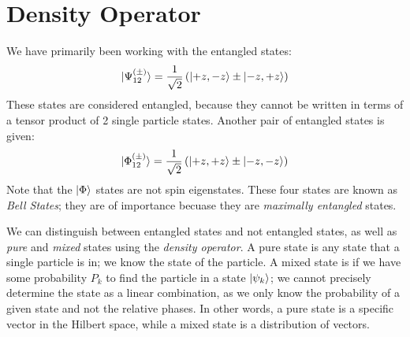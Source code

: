 \section{Density Operator}
We have primarily been working with the entangled states:
\begin{equation}
	\lvert\Psi_{12}^{(\pm)}\rangle=\frac{1}{\sqrt{2}}\left(\lvert+z,-z\rangle\pm \lvert-z,+z\rangle\right)
\end{equation}
These states are considered entangled, because they cannot be written in terms of a tensor product of 2 single particle states. Another pair of entangled states is given:
\begin{equation}
	\lvert\Phi_{12}^{(\pm)}\rangle=\frac{1}{\sqrt{2}}\left(\lvert+z,+z\rangle\pm\lvert-z,-z\rangle\right)
\end{equation}
Note that the \(\lvert\Phi\rangle\) states are not spin eigenstates. These four states are known as \emph{Bell States}; they are of importance becuase they are \emph{maximally entangled} states.

We can distinguish between entangled states and not entangled states, as well as \emph{pure} and \emph{mixed} states using the \emph{density operator}. A pure state is any state that a single particle is in; we know the state of the particle. A mixed state is if we have some probability \(P_k\) to find the particle in a state \(\lvert\psi_k\rangle\); we cannot precisely determine the state as a linear combination, as we only know the probability of a given state and not the relative phases.
In other words, a pure state is a specific vector in the Hilbert space, while a mixed state is a distribution of vectors.

